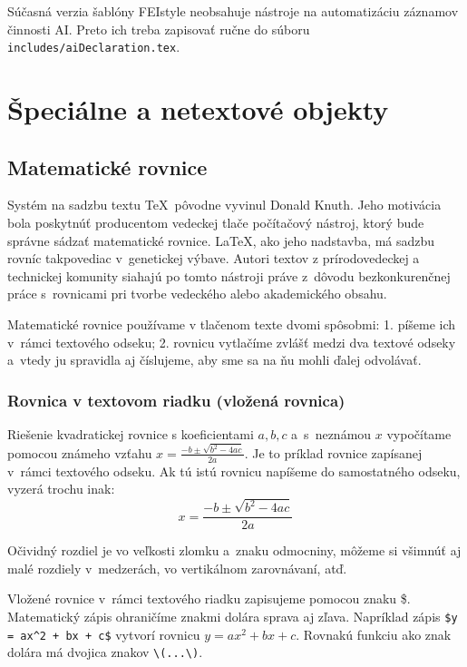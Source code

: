 Súčasná verzia šablóny FEIstyle neobsahuje nástroje na automatizáciu záznamov činnosti AI.
Preto ich treba zapisovať ručne do súboru \verb|includes/aiDeclaration.tex|.

\section{Špeciálne a netextové objekty}
\subsection{Matematické rovnice}
Systém na sadzbu textu \TeX\ pôvodne vyvinul Donald Knuth.
Jeho motivácia bola poskytnúť producentom vedeckej tlače
počítačový nástroj,
ktorý bude správne sádzať matematické rovnice.
\LaTeX, ako jeho nadstavba, má sadzbu rovníc takpovediac
v~genetickej výbave.
Autori textov z prírodovedeckej a technickej komunity siahajú po tomto nástroji
práve z~dôvodu bezkonkurenčnej práce s~rovnicami pri tvorbe 
vedeckého alebo akademického obsahu.

Matematické rovnice používame v tlačenom texte dvomi spôsobmi:
1. píšeme ich v~rámci textového odseku;
2. rovnicu vytlačíme zvlášť medzi dva textové odseky
a~vtedy ju spravidla aj číslujeme, aby sme sa na ňu mohli
ďalej odvolávať.

\subsubsection{Rovnica v textovom riadku (vložená rovnica)}
Riešenie kvadratickej rovnice s koeficientami $a,b,c$
a~s~neznámou $x$ vypočítame pomocou známeho vzťahu
$x=\frac{-b\pm\sqrt{b^2-4ac}}{2a}$.
Je to príklad rovnice zapísanej v~rámci textového odseku.
Ak tú istú rovnicu napíšeme do samostatného odseku,
vyzerá trochu inak:
$$
  x=\frac{-b\pm\sqrt{b^2-4ac}}{2a}
$$

Očividný rozdiel je vo veľkosti zlomku a~znaku odmocniny,
môžeme si všimnúť aj malé rozdiely v~medzerách,
vo vertikálnom zarovnávaní, atď. 

Vložené rovnice v~rámci textového riadku zapisujeme pomocou
znaku \$. 
Matematický zápis ohraničíme znakmi dolára sprava aj zľava.
Napríklad zápis \verb|$y = ax^2 + bx + c$| vytvorí rovnicu $y = ax^2 + bx + c$. Rovnakú funkciu ako znak dolára má dvojica znakov \verb|\(...\)|.

